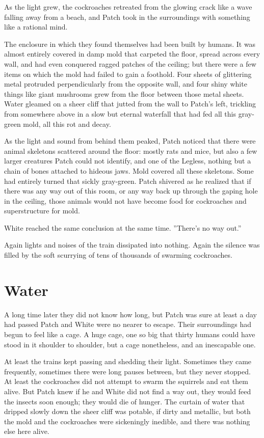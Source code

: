 \documentclass[12pt]{book}
\begin{document}
As the light grew, the cockroaches retreated from the glowing crack like a wave falling away from a beach, and Patch took in the surroundings with something like a rational mind.

The enclosure in which they found themselves had been built by humans. It was almost entirely covered in damp mold that carpeted the floor, spread across every wall, and had even conquered ragged patches of the ceiling; but there were a few items on which the mold had failed to gain a foothold. Four sheets of glittering metal protruded perpendicularly from the opposite wall, and four shiny white things like giant mushrooms grew from the floor between those metal sheets. Water gleamed on a sheer cliff that jutted from the wall to Patch's left, trickling from somewhere above in a slow but eternal waterfall that had fed all this gray-green mold, all this rot and decay.

As the light and sound from behind them peaked, Patch noticed that there were animal skeletons scattered around the floor: mostly rats and mice, but also a few larger creatures Patch could not identify, and one of the Legless, nothing but a chain of bones attached to hideous jaws. Mold covered all these skeletons. Some had entirely turned that sickly gray-green. Patch shivered as he realized that if there was any way out of this room, or any way back up through the gaping hole in the ceiling, those animals would not have become food for cockroaches and superstructure for mold.

White reached the same conclusion at the same time. ''There's no way out.''

Again lights and noises of the train dissipated into nothing. Again the silence was filled by the soft scurrying of tens of thousands of swarming cockroaches.


\section{Water}

A long time later %
they did not know how long, but Patch was sure at least a day had passed %
Patch and White were no nearer to escape. Their surroundings had begun to feel like a cage. A huge cage, one so big that thirty humans could have stood in it shoulder to shoulder, but a cage nonetheless, and an inescapable one.

At least the trains kept passing and shedding their light. Sometimes they came frequently, sometimes there were long pauses between, but they never stopped. At least the cockroaches did not attempt to swarm the squirrels and eat them alive. But Patch knew if he and White did not find a way out, they would feed the insects soon enough; they would die of hunger. The curtain of water that dripped slowly down the sheer cliff was potable, if dirty and metallic, but both the mold and the cockroaches were sickeningly inedible, and there was nothing else here alive.
\end{document}
